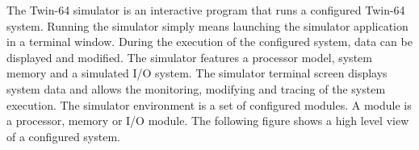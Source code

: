 %
%

The Twin-64 simulator is an interactive program that runs a configured Twin-64 system. Running the simulator simply means launching the simulator application in a terminal window. During the execution of the configured system, data can be displayed and modified. The simulator features a processor model, system memory and a simulated I/O system. The simulator terminal screen displays system data and allows the monitoring, modifying and tracing of the system execution. The simulator environment is a set of configured modules. A module is a processor, memory or I/O module. The following figure shows a high level view of a configured system.

